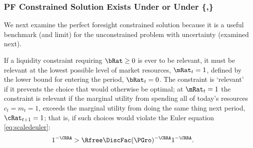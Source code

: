 \documentclass[BufferStockTheory]{subfiles}
\begin{document}
\begin{comment}
\begin{align}
  \DiscFac \Pat^{1-\CRRA} & < 1
\\ \DiscFac \Rfree \Pat^{1-\CRRA} & < \Rfree  
\\ (\DiscFac \Rfree)^{1/\CRRA} \Pat^{1/\CRRA-1} & < (\Rfree)^{1/\CRRA}
\\ \Pat^{1/\CRRA} & < (\Rfree)^{1/\CRRA}
\\ \Pat/\Rfree & < 1
\end{align}
\begin{align}
  \left(\frac{1-(\Rfree \DiscFac)^{1/\CRRA}/\Rfree}{1-\DiscFac (\DiscFac \Rfree)^{1/\CRRA-1}}\right)
  
\end{align}

\begin{align}
1/\Rfree & ? \DiscFac (\DiscFac \Rfree)^{-1}
1/\DiscFac\Rfree & ?  (\DiscFac \Rfree)^{-1}
\end{align}
\end{comment}

\providecommand{\figName}{RelatePFGICFHWCRICPFFVAC} %
\providecommand{\figFile}{\figName} %
\hypertarget{\figName}{}

\hypertarget{PF-Constrained-Solution}{}
\hypertarget{Constrained-Solution}{}
\subsubsection{PF Constrained Solution Exists Under {\RIC} or Under \{\cncl{\RIC},\GICAbs\}}\label{subsec:PFCon}

We next examine the perfect foresight constrained solution because it is a useful benchmark (and limit) for the unconstrained problem with uncertainty (examined next).

If a liquidity constraint requiring $\bRat \geq 0$ is ever to be relevant, it must be
relevant at the lowest possible level of market resources,
$\mRat_{t}=1$, defined by the lower bound for entering the period, 
$\bRat_{t}=0$.  The constraint is `relevant' if
it prevents the choice that would otherwise be optimal; at
$\mRat_{t}=1$ the constraint is relevant if the marginal utility from spending all of today's
resources $c_{t}=m_{t}=1$, exceeds the marginal utility from
doing the same thing next period, $\cRat_{t+1}=1$; that is, if such
choices would violate the Euler equation \eqref{eq:scaledeuler}:
\begin{align}
  1^{-\CRRA}  & > \Rfree \DiscFac (\PGro)^{-\CRRA}1^{-\CRRA}  \label{eq:LiqConstrBinds}.
\end{align}
\end{document}
